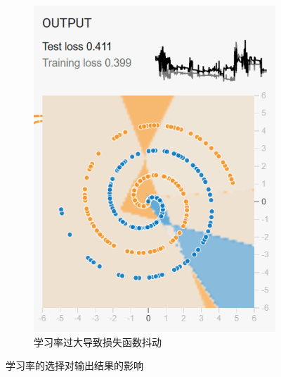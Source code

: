 \documentclass[printMode=false, declarePage=false]{ecnuthesis}
\begin{document}
\begin{figure}[htbp]
\begin{subfigure}[b]{0.3\textwidth}
            \includegraphics[width=\textwidth]{too-fast-1.png}
            \caption{学习率过大导致损失函数抖动}
            \label{fig:another}
        \end{subfigure}
        \caption{学习率的选择对输出结果的影响}
        \label{fig:comparison}
    \end{figure}
\end{document}
